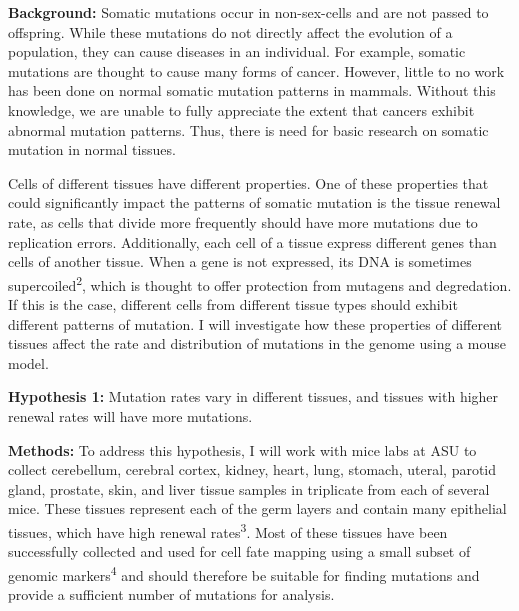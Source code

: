 \documentclass[12pt]{article}
\begin{document}
\noindent
\textbf{Background:}
Somatic mutations occur in non-sex-cells and are not passed to offspring.
While these mutations do not directly affect the evolution of a population, they can cause diseases in an individual.
For example, somatic mutations are thought to cause many forms of cancer.
However, little to no work has been done on normal somatic mutation patterns in mammals.
Without this knowledge, we are unable to fully appreciate the extent that cancers exhibit abnormal mutation patterns.
Thus, there is need for basic research on somatic mutation in normal tissues.

Cells of different tissues have different properties.
One of these properties that could significantly impact the patterns of somatic mutation is the tissue renewal rate, as cells that divide more frequently should have more mutations due to replication errors.
Additionally, each cell of a tissue express different genes than cells of another tissue.
When a gene is not expressed, its DNA is sometimes supercoiled\textsuperscript{2}, which is thought to offer protection from mutagens and degredation.
If this is the case, different cells from different tissue types should exhibit different patterns of mutation.
I will investigate how these properties of different tissues affect the rate and distribution of mutations in the genome using a mouse model.

\textbf{Hypothesis 1:}
Mutation rates vary in different tissues, and tissues with higher renewal rates will have more mutations.

\textbf{Methods:}
To address this hypothesis, I will work with mice labs at ASU to collect cerebellum, cerebral cortex, kidney, heart, lung, stomach, uteral, parotid gland, prostate, skin, and liver tissue samples in triplicate from each of several mice.
These tissues represent each of the germ layers and contain many epithelial tissues, which have high renewal rates\textsuperscript{3}.
Most of these tissues have been successfully collected and used for cell fate mapping using a small subset of genomic markers\textsuperscript{4} and should therefore be suitable for finding mutations and provide a sufficient number of mutations for analysis.
\end{document}

